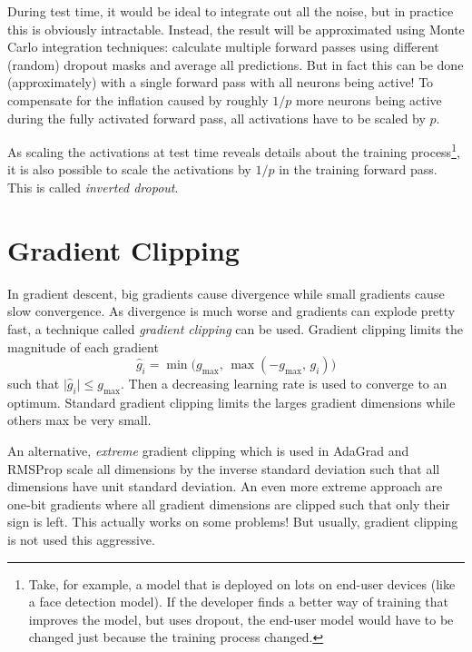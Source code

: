 		During test time, it would be ideal to integrate out all the noise, but in practice this is obviously intractable. Instead, the result will be approximated using Monte Carlo integration techniques: calculate multiple forward passes using different (random) dropout masks and average all predictions. But in fact this can be done (approximately) with a single forward pass with all neurons being active! To compensate for the inflation caused by roughly \(1/p\) more neurons being active during the fully activated forward pass, all activations have to be scaled by \(p\).

		As scaling the activations at test time reveals details about the training process\footnote{Take, for example, a model that is deployed on lots on end-user devices (like a face detection model). If the developer finds a better way of training that improves the model, but uses dropout, the end-user model would have to be changed just because the training process changed.}, it is also possible to scale the activations by \(1/p\) in the training forward pass. This is called \emph{inverted dropout}.

	\section{Gradient Clipping}
		In gradient descent, big gradients cause divergence while small gradients cause slow convergence. As divergence is much worse and gradients can explode pretty fast, a technique called \emph{gradient clipping} can be used. Gradient clipping limits the magnitude of each gradient
		\begin{equation}
			\hat{g}_i = \min\big( g_\mathrm{max},\, \max(-g_\mathrm{max},\, g_i) \big)
		\end{equation}
		such that \( \lvert \hat{g}_i \rvert \leq g_\mathrm{max} \). Then a decreasing learning rate is used to converge to an optimum. Standard gradient clipping limits the larges gradient dimensions while others max be very small.

		An alternative, \emph{extreme} gradient clipping which is used in AdaGrad and RMSProp scale all dimensions by the inverse standard deviation such that all dimensions have unit standard deviation. An even more extreme approach are one-bit gradients where all gradient dimensions are clipped such that only their sign is left. This actually works on some problems! But usually, gradient clipping is not used this aggressive.

